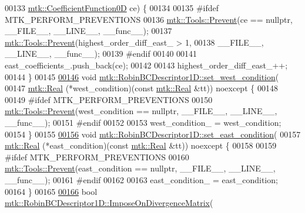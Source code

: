 \begin{DoxyCode}
00133     \hyperlink{group__c07-mim__ops_ga04276745b4d511f0f3c636d6e0df7c2d}{mtk::CoefficientFunction0D} ce) \{
00134 
00135 \textcolor{preprocessor}{  #ifdef MTK\_PERFORM\_PREVENTIONS}
00136   \hyperlink{classmtk_1_1Tools_a332324c6f25e66be9dff48c5987a3b9f}{mtk::Tools::Prevent}(ce == \textcolor{keyword}{nullptr}, \_\_FILE\_\_, \_\_LINE\_\_, \_\_func\_\_);
00137   \hyperlink{classmtk_1_1Tools_a332324c6f25e66be9dff48c5987a3b9f}{mtk::Tools::Prevent}(highest\_order\_diff\_east\_ > 1,
00138                       \_\_FILE\_\_, \_\_LINE\_\_, \_\_func\_\_);
00139 \textcolor{preprocessor}{  #endif}
00140 
00141   east\_coefficients\_.push\_back(ce);
00142 
00143   highest\_order\_diff\_east\_++;
00144 \}
00145 
\hypertarget{mtk__robin__bc__descriptor__1d_8cc_source_l00146}{}\hyperlink{classmtk_1_1RobinBCDescriptor1D_a06bfaf0126d528247c3c76fdd19f4b85}{00146} \textcolor{keywordtype}{void} \hyperlink{classmtk_1_1RobinBCDescriptor1D_a06bfaf0126d528247c3c76fdd19f4b85}{mtk::RobinBCDescriptor1D::set\_west\_condition}(
00147     \hyperlink{group__c01-roots_gac080bbbf5cbb5502c9f00405f894857d}{mtk::Real} (*west\_condition)(\textcolor{keyword}{const} \hyperlink{group__c01-roots_gac080bbbf5cbb5502c9f00405f894857d}{mtk::Real} &tt)) noexcept \{
00148 
00149 \textcolor{preprocessor}{  #ifdef MTK\_PERFORM\_PREVENTIONS}
00150   \hyperlink{classmtk_1_1Tools_a332324c6f25e66be9dff48c5987a3b9f}{mtk::Tools::Prevent}(west\_condition == \textcolor{keyword}{nullptr}, \_\_FILE\_\_, \_\_LINE\_\_, \_\_func\_\_);
00151 \textcolor{preprocessor}{  #endif}
00152 
00153   west\_condition\_ = west\_condition;
00154 \}
00155 
\hypertarget{mtk__robin__bc__descriptor__1d_8cc_source_l00156}{}\hyperlink{classmtk_1_1RobinBCDescriptor1D_a4edc92eeaaaa3f1e7f2cedfea3d35681}{00156} \textcolor{keywordtype}{void} \hyperlink{classmtk_1_1RobinBCDescriptor1D_a4edc92eeaaaa3f1e7f2cedfea3d35681}{mtk::RobinBCDescriptor1D::set\_east\_condition}(
00157     \hyperlink{group__c01-roots_gac080bbbf5cbb5502c9f00405f894857d}{mtk::Real} (*east\_condition)(\textcolor{keyword}{const} \hyperlink{group__c01-roots_gac080bbbf5cbb5502c9f00405f894857d}{mtk::Real} &tt)) noexcept \{
00158 
00159 \textcolor{preprocessor}{  #ifdef MTK\_PERFORM\_PREVENTIONS}
00160   \hyperlink{classmtk_1_1Tools_a332324c6f25e66be9dff48c5987a3b9f}{mtk::Tools::Prevent}(east\_condition == \textcolor{keyword}{nullptr}, \_\_FILE\_\_, \_\_LINE\_\_, \_\_func\_\_);
00161 \textcolor{preprocessor}{  #endif}
00162 
00163   east\_condition\_ = east\_condition;
00164 \}
00165 
\hypertarget{mtk__robin__bc__descriptor__1d_8cc_source_l00166}{}\hyperlink{classmtk_1_1RobinBCDescriptor1D_a09b026a79dde6e8dc14e981a45320863}{00166} \textcolor{keywordtype}{bool} \hyperlink{classmtk_1_1RobinBCDescriptor1D_a09b026a79dde6e8dc14e981a45320863}{mtk::RobinBCDescriptor1D::ImposeOnDivergenceMatrix}(

\end{DoxyCode}
